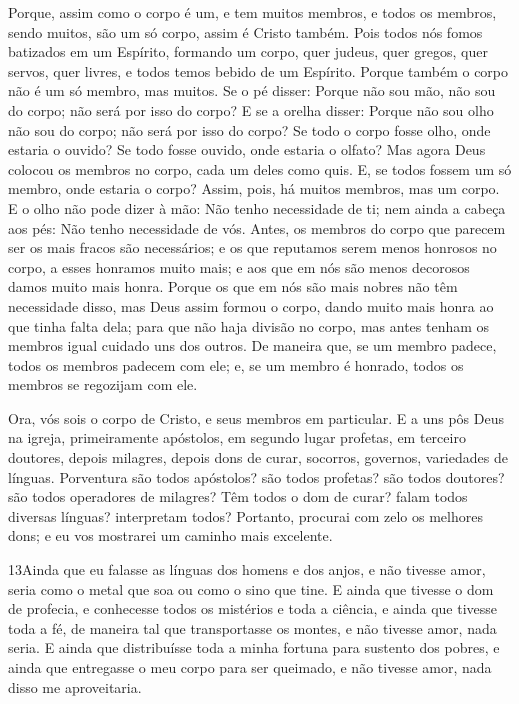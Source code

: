 Porque, assim como o corpo é um, e tem muitos membros, e todos os
membros, sendo muitos, são um só corpo, assim é Cristo também.
Pois todos nós fomos batizados em um Espírito, formando um
corpo, quer judeus, quer gregos, quer servos, quer livres, e todos
temos bebido de um Espírito. Porque também o corpo não é um
só membro, mas muitos. Se o pé disser: Porque não sou mão,
não sou do corpo; não será por isso do corpo? E se a orelha
disser: Porque não sou olho não sou do corpo; não será por isso do
corpo? Se todo o corpo fosse olho, onde estaria o ouvido? Se
todo fosse ouvido, onde estaria o olfato? Mas agora Deus
colocou os membros no corpo, cada um deles como quis. E, se
todos fossem um só membro, onde estaria o corpo? Assim, pois,
há muitos membros, mas um corpo. E o olho não pode dizer à
mão: Não tenho necessidade de ti; nem ainda a cabeça aos pés: Não
tenho necessidade de vós. Antes, os membros do corpo que
parecem ser os mais fracos são necessários; e os que
reputamos serem menos honrosos no corpo, a esses honramos muito
mais; e aos que em nós são menos decorosos damos muito mais honra.
Porque os que em nós são mais nobres não têm necessidade
disso, mas Deus assim formou o corpo, dando muito mais honra ao que
tinha falta dela; para que não haja divisão no corpo, mas
antes tenham os membros igual cuidado uns dos outros. De
maneira que, se um membro padece, todos os membros padecem com ele;
e, se um membro é honrado, todos os membros se regozijam com ele.

Ora, vós sois o corpo de Cristo, e seus membros em particular.
E a uns pôs Deus na igreja, primeiramente apóstolos, em
segundo lugar profetas, em terceiro doutores, depois milagres,
depois dons de curar, socorros, governos, variedades de línguas.
Porventura são todos apóstolos? são todos profetas? são todos
doutores? são todos operadores de milagres? Têm todos o dom
de curar? falam todos diversas línguas? interpretam todos?
Portanto, procurai com zelo os melhores dons; e eu vos
mostrarei um caminho mais excelente.

\medskip

\lettrine{13} Ainda que eu falasse as línguas dos homens e dos
anjos, e não tivesse amor, seria como o metal que soa ou como o sino
que tine. E ainda que tivesse o dom de profecia, e conhecesse
todos os mistérios e toda a ciência, e ainda que tivesse toda a fé,
de maneira tal que transportasse os montes, e não tivesse amor, nada
seria. E ainda que distribuísse toda a minha fortuna para
sustento dos pobres, e ainda que entregasse o meu corpo para ser
queimado, e não tivesse amor, nada disso me aproveitaria.

